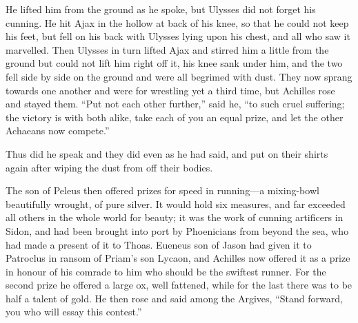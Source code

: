 He lifted him from the ground as he spoke, but Ulysses did not forget his
cunning. He hit Ajax in the hollow at back of his knee, so that he could
not keep his feet, but fell on his back with Ulysses lying upon his chest,
and all who saw it marvelled. Then Ulysses in turn lifted Ajax and stirred
him a little from the ground but could not lift him right off it, his knee
sank under him, and the two fell side by side on the ground and were all
begrimed with dust. They now sprang towards one another and were for
wrestling yet a third time, but Achilles rose and stayed them. “Put not
each other further,” said he, “to such cruel suffering; the victory is
with both alike, take each of you an equal prize, and let the other
Achaeans now compete.”

Thus did he speak and they did even as he had said, and put on their
shirts again after wiping the dust from off their bodies.

The son of Peleus then offered prizes for speed in running—a
mixing-bowl beautifully wrought, of pure silver. It would hold six
measures, and far exceeded all others in the whole world for beauty; it
was the work of cunning artificers in Sidon, and had been brought into
port by Phoenicians from beyond the sea, who had made a present of it to
Thoas. Eueneus son of Jason had given it to Patroclus in ransom of Priam’s
son Lycaon, and Achilles now offered it as a prize in honour of his
comrade to him who should be the swiftest runner. For the second prize he
offered a large ox, well fattened, while for the last there was to be half
a talent of gold. He then rose and said among the Argives, “Stand forward,
you who will essay this contest.”

